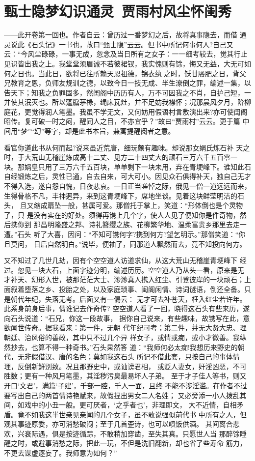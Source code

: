 \chapter{甄士隐梦幻识通灵~贾雨村风尘怀闺秀}

——此开卷第一回也。作者自云：曾历过一番梦幻之后，故将真事隐去，而借
通灵说此《石头记》一书也，故曰“甄士隐”云云。但书中所记何事何人?自己又
云：“今风尘碌碌，一事无成，忽念及当日所有之女子：一一细考较去，觉其行止
见识皆出我之上。我堂堂须眉诚不若彼裙钗，我实愧则有馀，悔又无益，大无可如
何之日也。当此日，欲将已往所赖天恩祖德，锦衣纨之时，饫甘餍肥之日，背父
兄教育之恩，负师友规训之德，以致今日一技无成、半生潦倒之罪，编述一集，以
告天下；知我之负罪固多，然闺阁中历历有人，万不可因我之不肖，自护己短，一
并使其泯灭也。所以蓬牖茅椽，绳床瓦灶，并不足妨我襟怀；况那晨风夕月，阶柳
庭花，更觉得润人笔墨。我虽不学无文，又何妨用假语村言敷演出来?亦可使闺阁
昭传。复可破一时之闷，醒同人之目，不亦宜乎？”故曰“贾雨村”云云。更于篇
中间用“梦”“幻”等字，却是此书本旨，兼寓提醒阅者之意。

看官你道此书从何而起?说来虽近荒唐，细玩颇有趣味。却说那女娲氏炼石补
天之时，于大荒山无稽崖炼成高十二丈、见方二十四丈大的顽石三万六千五百零一
块。那娲皇只用了三万六千五百块，单单剩下一块未用，弃在青埂峰下。谁知此石
自经锻炼之后，灵性已通，自去自来，可大可小。因见众石俱得补天，独自己无才
不得入选，遂自怨自愧，日夜悲哀。一日正当嗟悼之际，俄见一僧一道远远而来，
生得骨格不凡，丰神迥异，来到这青埂峰下，席地坐谈。见着这块鲜莹明洁的石头，
且又缩成扇坠一般，甚属可爱。那僧托于掌上，笑道：“形体倒也是个灵物了，只
是没有实在的好处。须得再镌上几个字，使人人见了便知你是件奇物，然后携你到
那昌明隆盛之邦、诗礼簪缨之族、花柳繁华地、温柔富贵乡那里去走一遭。”石头
听了大喜，因问：“不知可镌何字?携到何方?望乞明示。”那僧笑道：“你且莫问，
日后自然明白。”说毕，便袖了，同那道人飘然而去，竟不知投向何方。

又不知过了几世几劫，因有个空空道人访道求仙，从这大荒山无稽崖青埂峰下
经过。忽见一块大石，上面字迹分明，编述历历。空空道人乃从头一看，原来是无
才补天、幻形入世，被那茫茫大士、渺渺真人携入红尘、引登彼岸的一块顽石；上
面叙着堕落之乡、投胎之处，以及家庭琐事、闺阁闲情、诗词谜语，倒还全备。只
是朝代年纪，失落无考。后面又有一偈云：
无才可去补苍天，枉入红尘若许年。
此系身前身后事，倩谁记去作奇传?
空空道人看了一回，晓得这石头有些来历，遂向石头说道：“石兄，你这一段故事，
据你自己说来，有些趣味，故镌写在此，意欲闻世传奇。据我看来：第一件，无朝
代年纪可考；第二件，并无大贤大忠、理朝廷、治风俗的善政，其中只不过几个异
样女子，或情或痴，或小才微善。我纵然抄去，也算不得一种奇书。”石头果然答
道：“我师何必太痴!我想历来野史的朝代，无非假借汉、唐的名色；莫如我这石头
所记不借此套，只按自己的事体情理，反倒新鲜别致。况且那野史中，或讪谤君相，
或贬人妻女，奸淫凶恶，不可胜数；更有一种风月笔墨，其淫秽污臭最易坏人子弟。
至于才子佳人等书，则又开口‘文君’，满篇‘子建’，千部一腔，千人一面，且终
不能不涉淫滥。在作者不过要写出自己的两首情诗艳赋来，故假捏出男女二人名姓；
又必旁添一小人拨乱其间，如戏中的小丑一般。更可厌者，‘之乎者也’，非理即文，
大不近情，自相矛盾。竟不如我这半世亲见亲闻的几个女子，虽不敢说强似前代书
中所有之人，但观其事迹原委，亦可消愁破闷；至于几首歪诗，也可以喷饭供酒。
其间离合悲欢，兴衰际遇，俱是按迹循踪，不敢稍加穿凿，至失其真。只愿世人当
那醉馀睡醒之时，或避事消愁之际，把此一玩，不但是洗旧翻新，却也省了些寿命
筋力，不更去谋虚逐妄了。我师意为如何？”


